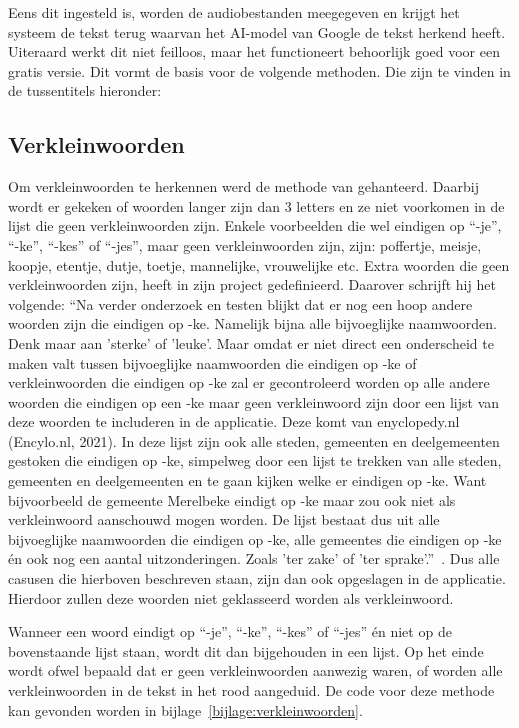 Eens dit ingesteld is, worden de audiobestanden meegegeven en krijgt het systeem de tekst terug waarvan het AI-model van Google de tekst herkend heeft. Uiteraard werkt dit niet feilloos, maar  het functioneert behoorlijk goed voor een gratis versie. Dit vormt de basis voor de volgende methoden. Die zijn te vinden in de tussentitels hieronder:

\subsection{Verkleinwoorden}
Om verkleinwoorden te herkennen werd de methode van \textcite{Standaert2021} gehanteerd. Daarbij wordt er gekeken of woorden langer zijn dan 3 letters en ze niet voorkomen in de lijst die geen verkleinwoorden zijn. Enkele voorbeelden die wel eindigen op ``-je'', ``-ke'', ``-kes'' of ``-jes'', maar geen verkleinwoorden zijn, zijn: poffertje, meisje, koopje, etentje, dutje, toetje, mannelijke, vrouwelijke etc. Extra woorden die geen verkleinwoorden zijn, heeft \textcite{Standaert2021} in zijn project gedefinieerd. Daarover schrijft hij het volgende:
``Na verder onderzoek en testen blijkt dat er nog een hoop andere woorden zijn die eindigen
op -ke. Namelijk bijna alle bijvoeglijke naamwoorden. Denk maar aan ’sterke’ of ’leuke’.
Maar omdat er niet direct een onderscheid te maken valt tussen bijvoeglijke naamwoorden
die eindigen op -ke of verkleinwoorden die eindigen op -ke zal er gecontroleerd worden op
alle andere woorden die eindigen op een -ke maar geen verkleinwoord zijn door een lijst
van deze woorden te includeren in de applicatie. Deze komt van enyclopedy.nl (Encylo.nl,
2021). In deze lijst zijn ook alle steden, gemeenten en deelgemeenten gestoken die eindigen
op -ke, simpelweg door een lijst te trekken van alle steden, gemeenten en deelgemeenten
en te gaan kijken welke er eindigen op -ke. Want bijvoorbeeld de gemeente Merelbeke
eindigt op -ke maar zou ook niet als verkleinwoord aanschouwd mogen worden. De lijst
bestaat dus uit alle bijvoeglijke naamwoorden die eindigen op -ke, alle gemeentes die
eindigen op -ke én ook nog een aantal uitzonderingen. Zoals ’ter zake’ of ’ter sprake’.''~\autocite{Standaert2021}. Dus alle casusen die hierboven beschreven staan, zijn dan ook opgeslagen in de applicatie. Hierdoor zullen deze woorden niet geklasseerd worden als verkleinwoord.

Wanneer een woord eindigt op ``-je'', ``-ke'', ``-kes'' of ``-jes'' én niet op de bovenstaande lijst staan, wordt dit dan bijgehouden in een lijst. Op het einde wordt ofwel bepaald dat er geen verkleinwoorden aanwezig waren, of worden alle verkleinwoorden in de tekst in het rood aangeduid. De code voor deze methode kan gevonden worden in bijlage~\ref{bijlage:verkleinwoorden}.


